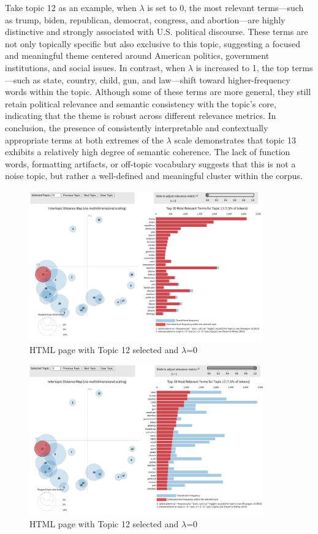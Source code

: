 \documentclass[12pt]{article}
\begin{document}
	Take topic 12 as an example, when $\lambda$ is set to 0, the most relevant terms—such as trump, biden, republican, democrat, congress, and abortion—are highly distinctive and strongly associated with U.S. political discourse. These terms are not only topically specific but also exclusive to this topic, suggesting a focused and meaningful theme centered around American politics, government institutions, and social issues.	In contrast, when $\lambda$ is increased to 1, the top terms—such as state, country, child, gun, and law—shift toward higher-frequency words within the topic. Although some of these terms are more general, they still retain political relevance and semantic consistency with the topic’s core, indicating that the theme is robust across different relevance metrics. In conclusion, the presence of consistently interpretable and contextually appropriate terms at both extremes of the $\lambda$ scale demonstrates that topic 13 exhibits a relatively high degree of semantic coherence. The lack of function words, formatting artifacts, or off-topic vocabulary suggests that this is not a noise topic, but rather a well-defined and meaningful cluster within the corpus.
	\begin{figure}[H]
			\centering
			\includegraphics[width=0.9\textwidth]{Q2r0} 
			\caption{\centering HTML page with Topic 12 selected and $\lambda$=0}		
	\end{figure}
	\begin{figure}[H]
			\centering
			\includegraphics[width=0.9\textwidth]{Q2r1} 
			\caption{\centering HTML page with Topic 12 selected and $\lambda$=0}		
	\end{figure}
\end{document}

